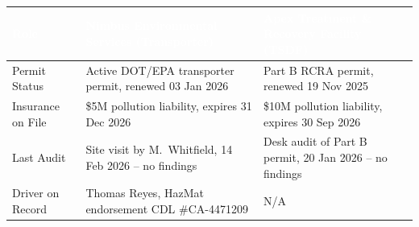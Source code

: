 \vspace{8pt}


\vspace{4pt}


\vspace{6pt}

\noindent
\small
\begin{tabularx}{\linewidth}{@{} >{\raggedright\arraybackslash}p{2.4cm} X X @{}}
\toprule
\rowcolor{SlateInk}
\textcolor{white}{\textbf{Role}} &
\textcolor{white}{\textbf{Nimbus Environmental Services (Transporter)}} &
\textcolor{white}{\textbf{Apex Treatment \& Recovery Facility (TSDF)}} \\
\midrule
\rowcolor{SandFog}
Permit Status & Active DOT/EPA transporter permit, renewed 03 Jan 2026 & Part B RCRA permit, renewed 19 Nov 2025 \\[3pt]
\rowcolor{white}
Insurance on File & \$5M pollution liability, expires 31 Dec 2026 & \$10M pollution liability, expires 30 Sep 2026 \\[3pt]
\rowcolor{SandFog}
Last Audit & Site visit by M.\ Whitfield, 14 Feb 2026 -- no findings & Desk audit of Part B permit, 20 Jan 2026 -- no findings \\[3pt]
\rowcolor{white}
Driver on Record & Thomas Reyes, HazMat endorsement CDL \#CA-4471209 & N/A \\[3pt]
\bottomrule
\end{tabularx}
